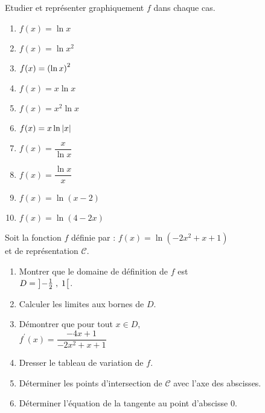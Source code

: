   \begin{exercice}

 Etudier et représenter graphiquement  $ f $  dans chaque cas.

\begin{enumerate}
\item $ f(x)=\ln x $ 
\item $ f(x)=\ln x^{2} $
\item $ f(x)=\left(\ln x \right)^{2}$   
\item $f(x)= x\ln x $  
\item $f(x)= x^{2}\ln x $ 
\item $f(x)= x\ln \left\lvert x \right\rvert $   
\item  $f(x)= \dfrac{x}{\ln x}  $  
 \item $ f(x)= \dfrac{\ln x}{x}$ 
  \item  $f(x)= \ln(x-2)  $ 
   \item  $f(x)= \ln(4-2x)  $ 
   
\end{enumerate}

 \end{exercice}
 
 \begin{exercice}
 
 Soit la fonction $ f $ définie par : $ f(x)=\ln(-2x^{2}+x+1)  $\\ et  de  représentation $ \mathscr{C} $.
 \begin{enumerate}
 \item Montrer que le domaine de définition de $ f $  est\\ $D=\left]-\frac{1}{2} \;,\; 1\right[ $.
 \item Calculer les limites aux bornes de $ D $.
 \item Démontrer que pour tout $ x\in D$,\\ $ f^{\prime}(x)=\dfrac{-4x+1}{-2x^{2}+x+1} $
  \item Dresser le tableau de variation de $ f. $
  \item Déterminer les points d'intersection de $ \mathscr{C} $ avec l'axe des abscisses.
  \item Déterminer l'équation de la tangente au point d'abscisse $ 0 $.
 \end{enumerate}
  \end{exercice}
 
